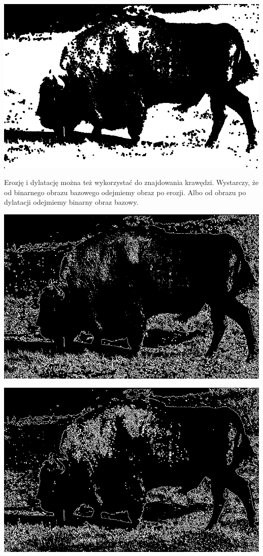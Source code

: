 \documentclass{article}
\begin{document}
	\begin{center}
		\includegraphics[width=\linewidth]{../../lab03/bison_close.png}
	\end{center}

	Erozję i dylatację można też wykorzystać do znajdowania krawędzi.
	Wystarczy, że od binarnego obrazu bazowego odejmiemy obraz po erozji. Albo od obrazu po dylatacji odejmiemy binarny obraz bazowy.
	\begin{center}
		\includegraphics[width=\linewidth]{../../lab03/bison_edge_erode.png}
	\end{center}
	\begin{center}
		\includegraphics[width=\linewidth]{../../lab03/bison_edge_dilate.png}
	\end{center}
\end{document}
